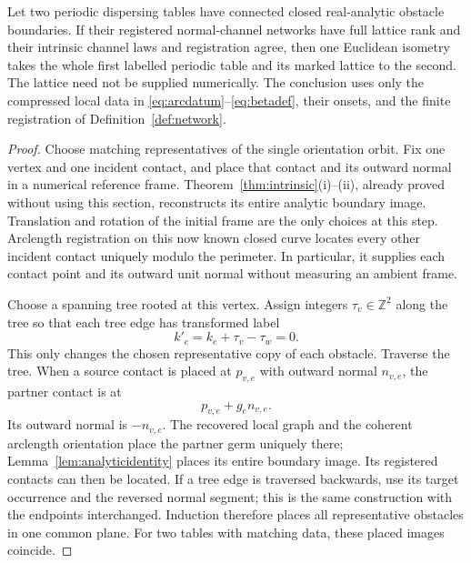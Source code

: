 \begin{theorem}\label{thm:network}
Let two periodic dispersing tables have connected closed real-analytic
obstacle boundaries. If their registered normal-channel networks have
full lattice rank and their intrinsic channel laws and registration agree,
then one Euclidean isometry takes the whole first labelled periodic table
and its marked lattice to the second. The lattice need not be supplied
numerically. The conclusion uses only the compressed local data in
\eqref{eq:arcdatum}--\eqref{eq:betadef}, their onsets, and the finite
registration of Definition~\ref{def:network}.
\end{theorem}
\begin{proof}
Choose matching representatives of the single orientation orbit. Fix
one vertex and one incident contact, and place that contact and its
outward normal in a numerical reference frame. Theorem~\ref{thm:intrinsic}(i)--(ii),
already proved without using this section, reconstructs its entire
analytic boundary image. Translation and rotation of the initial frame
are the only choices at this step. Arclength registration on this now
known closed curve locates every other incident contact uniquely modulo
the perimeter. In particular, it supplies each contact point and its
outward unit normal without measuring an ambient frame.

Choose a spanning tree rooted at this vertex. Assign integers
$\tau_v\in\mathbb Z^2$ along the tree so that each tree edge has
transformed label
\[
 k'_e=k_e+\tau_v-\tau_w=0.
\]
This only changes the chosen representative copy of each obstacle.
Traverse the tree. When a source contact is placed at $p_{v,e}$ with
outward normal $n_{v,e}$, the partner contact is at
\begin{equation}\label{eq:placepartner}
 p_{v,e}+g_e n_{v,e}.
\end{equation}
Its outward normal is $-n_{v,e}$. The recovered local graph and the
coherent arclength orientation place the partner germ uniquely there;
Lemma~\ref{lem:analyticidentity} places its entire boundary image.
Its registered contacts can then be located. If a tree edge is traversed
backwards, use its target occurrence and the reversed normal segment;
this is the same construction with the endpoints interchanged. Induction
therefore places all representative obstacles in one common plane.
For two tables with matching data, these placed images coincide.


\end{proof}
